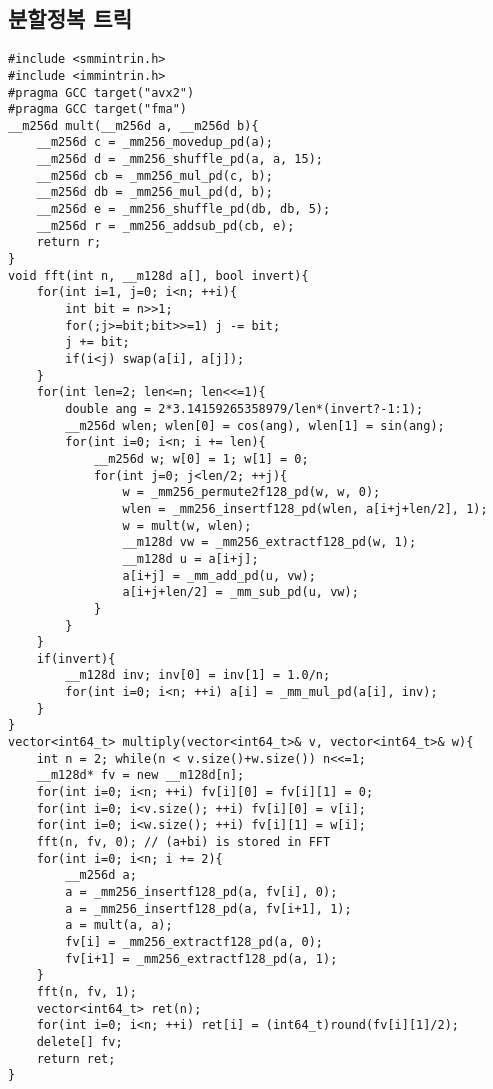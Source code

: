 \documentclass[landscape, 8pt, a4paper, oneside, twocolumn]{extarticle}
\begin{document}
\subsection{분할정복 트릭}
\begin{verbatim}
#include <smmintrin.h>
#include <immintrin.h>
#pragma GCC target("avx2")
#pragma GCC target("fma")
__m256d mult(__m256d a, __m256d b){
	__m256d c = _mm256_movedup_pd(a);
	__m256d d = _mm256_shuffle_pd(a, a, 15);
	__m256d cb = _mm256_mul_pd(c, b);
	__m256d db = _mm256_mul_pd(d, b);
	__m256d e = _mm256_shuffle_pd(db, db, 5);
	__m256d r = _mm256_addsub_pd(cb, e);
	return r;
}
void fft(int n, __m128d a[], bool invert){
	for(int i=1, j=0; i<n; ++i){
		int bit = n>>1;
		for(;j>=bit;bit>>=1) j -= bit;
		j += bit;
		if(i<j) swap(a[i], a[j]);
	}
	for(int len=2; len<=n; len<<=1){
		double ang = 2*3.14159265358979/len*(invert?-1:1);
		__m256d wlen; wlen[0] = cos(ang), wlen[1] = sin(ang);
		for(int i=0; i<n; i += len){
			__m256d w; w[0] = 1; w[1] = 0;
			for(int j=0; j<len/2; ++j){
				w = _mm256_permute2f128_pd(w, w, 0);
				wlen = _mm256_insertf128_pd(wlen, a[i+j+len/2], 1);
				w = mult(w, wlen);
				__m128d vw = _mm256_extractf128_pd(w, 1);
				__m128d u = a[i+j];
				a[i+j] = _mm_add_pd(u, vw);
				a[i+j+len/2] = _mm_sub_pd(u, vw);
			}
		}
	}
	if(invert){
		__m128d inv; inv[0] = inv[1] = 1.0/n;
		for(int i=0; i<n; ++i) a[i] = _mm_mul_pd(a[i], inv);
	}
}
vector<int64_t> multiply(vector<int64_t>& v, vector<int64_t>& w){
	int n = 2; while(n < v.size()+w.size()) n<<=1;
	__m128d* fv = new __m128d[n];
	for(int i=0; i<n; ++i) fv[i][0] = fv[i][1] = 0;
	for(int i=0; i<v.size(); ++i) fv[i][0] = v[i];
	for(int i=0; i<w.size(); ++i) fv[i][1] = w[i];
	fft(n, fv, 0); // (a+bi) is stored in FFT
	for(int i=0; i<n; i += 2){
		__m256d a;
		a = _mm256_insertf128_pd(a, fv[i], 0);
		a = _mm256_insertf128_pd(a, fv[i+1], 1);
		a = mult(a, a);
		fv[i] = _mm256_extractf128_pd(a, 0);
		fv[i+1] = _mm256_extractf128_pd(a, 1);
	}
	fft(n, fv, 1);
	vector<int64_t> ret(n);
	for(int i=0; i<n; ++i) ret[i] = (int64_t)round(fv[i][1]/2);
	delete[] fv;
	return ret;
}
\end{verbatim}
\end{document}
